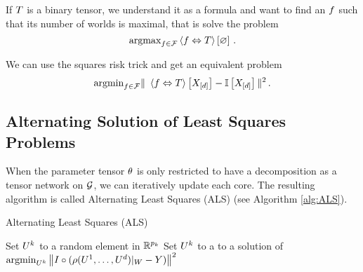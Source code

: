 If $T$ is a binary tensor, we understand it as a formula and want to find an $f$ such that its number of worlds is maximal, that is solve the problem
	\[ \mathrm{argmax}_{f\in\mathcal{F}}\left\langle f\Leftrightarrow T\right\rangle \left[ \varnothing \right]  \, . \]

We can use the squares risk trick and get an equivalent problem
	\[ \argmin_{\exformula\in\formulaset} \| \sbcontractionof{\exformula\Leftrightarrow\hypercore}{\shortcatvariables}  - \onesat{\shortcatvariables} \|^2 \, . \]






\subsection{Alternating Solution of Least Squares Problems}

When the parameter tensor $\theta$ is only restricted to have a decomposition as a tensor network on $\mathcal{G}$, we can iteratively update each core.
The resulting algorithm is called Alternating Least Squares (ALS) (see Algorithm \ref{alg:ALS}).

\begin{algorithm}[hbt!]
\caption{Alternating Least Squares (ALS)}\label{alg:ALS}
\begin{algorithmic}
\For{$\atomenumeratorin$}
	\State Set $U^{k}$ to a random element in $\mathbb{R}^{p_{k}}$ 
\EndFor
{}
\For{$\atomenumeratorin$}
	\State Set $U^{k}$ to a to a solution of $ \mathrm{argmin}_{U^{k}}  \left\|  I \circ ( {\rho(U^{1},\ldots,U^{d})}|_{W} - Y ) \right\|^2$
\EndFor
\EndWhile
\end{algorithmic}
\end{algorithm}



